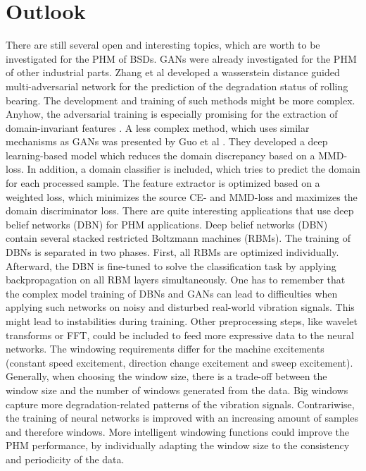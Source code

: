 \chapter{Outlook}
There are still several open and interesting topics, which are worth to be investigated for the PHM of BSDs. GANs were already investigated for the PHM of other industrial parts. Zhang et al \cite{Zhang2019} developed a wasserstein distance guided multi-adversarial network for the prediction of the degradation status of rolling bearing. The development and training of such methods might be more complex. Anyhow, the adversarial training is especially promising for the extraction of domain-invariant features \cite{Zhang2019}. A less complex method, which uses similar mechanisms as GANs was presented by Guo et al \cite{Guo2019}. They developed a deep learning-based model which reduces the domain discrepancy based on a MMD-loss. In addition, a domain classifier is included, which tries to predict the domain for each processed sample. The feature extractor is optimized based on a weighted loss, which minimizes the source CE- and MMD-loss and maximizes the domain discriminator loss. There are quite interesting applications that use deep belief networks (DBN) \cite{ZHAO2019213} for PHM applications. Deep belief networks (DBN) contain several stacked restricted Boltzmann machines (RBMs). The training of DBNs is separated in two phases. First, all RBMs are optimized individually. Afterward, the DBN is fine-tuned to solve the classification task by applying backpropagation on all RBM layers simultaneously. One has to remember that the complex model training of DBNs and GANs can lead to difficulties when applying such networks on noisy and disturbed real-world vibration signals. This might lead to instabilities during training. Other preprocessing steps, like wavelet transforms or FFT, could be included to feed more expressive data to the neural networks. The windowing requirements differ for the machine excitements (constant speed excitement, direction change excitement and sweep excitement). Generally, when choosing the window size, there is a trade-off between the window size and the number of windows generated from the data. Big windows capture more degradation-related patterns of the vibration signals. Contrariwise, the training of neural networks is improved with an increasing amount of samples and therefore windows.  More intelligent windowing functions could improve the PHM performance, by individually adapting the window size to the consistency and periodicity of the data.






